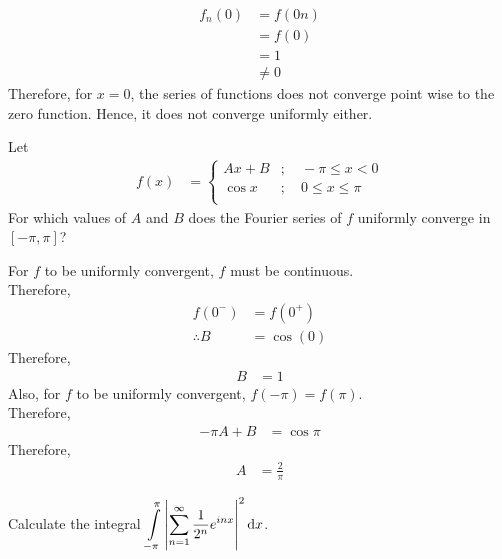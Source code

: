 \documentclass[fleqn, a4paper, 11pt, oneside]{amsart}
\theoremstyle{definition}
\theoremstyle{theorem}
\begin{document}
\begin{solution}
	\begin{align*}
		f_n(0) &= f(0 n)\\
		&= f(0)\\
		&= 1\\
		&\neq 0
	\end{align*}
	Therefore, for $x = 0$, the series of functions does not converge point wise to the zero function.
	Hence, it does not converge uniformly either.
\end{solution}

\begin{question}
	Let
	\begin{align*}
		f(x) &=
			\begin{cases}
				A x + B &;\quad -\pi \le x < 0\\
				\cos x &;\quad 0 \le x \le \pi\\
			\end{cases}
	\end{align*}
	For which values of $A$ and $B$ does the Fourier series of $f$ uniformly converge in $[-\pi,\pi]$?
\end{question}

\begin{solution}
	For $f$ to be uniformly convergent, $f$ must be continuous.\\
	Therefore,
	\begin{align*}
		f(0^-) &= f(0^+)\\
		\therefore B &= \cos(0)
	\end{align*}
	Therefore,
	\begin{align*}
		B &= 1
	\end{align*}
	Also, for $f$ to be uniformly convergent, $f(-\pi) = f(\pi)$.\\
	Therefore,
	\begin{align*}
		-\pi A + B &= \cos \pi
	\end{align*}
	Therefore,
	\begin{align*}
		A &= \frac{2}{\pi}
	\end{align*}
\end{solution}

\begin{question}
	Calculate the integral $\displaystyle \int\limits_{-\pi}^{\pi} \left| \sum\limits_{n = 1}^{\infty} \frac{1}{2^n} e^{i n x} \right|^2 \dif x$.
\end{question}
\end{document}
